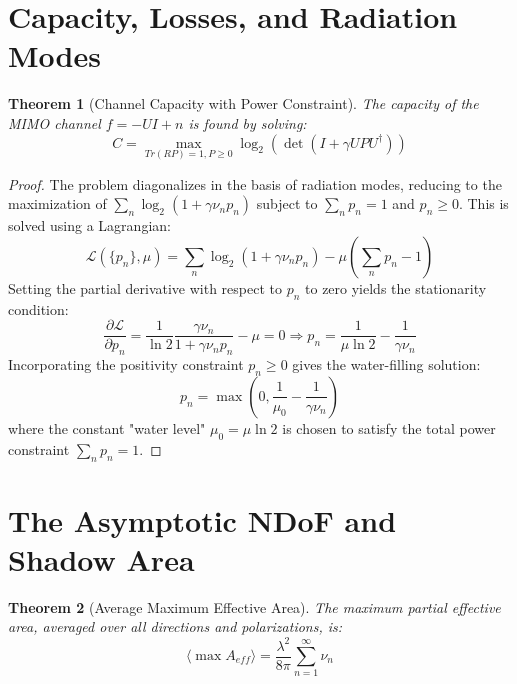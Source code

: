 \documentclass[11pt,a4paper]{article}
\newcommand{\herm}{\dagger}
\newtheorem{theorem}{Theorem}[section]
\begin{document}
\section{Capacity, Losses, and Radiation Modes}

\begin{theorem}[Channel Capacity with Power Constraint]
The capacity of the MIMO channel \(f=-UI+n\) is found by solving:
\begin{equation}
    C=\max_{Tr(RP)=1,P\ge0}\log_{2}(\det(I+\gamma UPU^{\herm}))
\end{equation}
\end{theorem}

\begin{proof}
The problem diagonalizes in the basis of radiation modes, reducing to the maximization of \(\sum_{n}\log_{2}(1+\gamma\nu_{n}p_{n})\) subject to \(\sum_{n}p_{n}=1\) and \(p_{n}\ge0\). This is solved using a Lagrangian:
\begin{equation}
    \mathcal{L}(\{p_{n}\},\mu)=\sum_{n}\log_{2}(1+\gamma\nu_{n}p_{n})-\mu\left(\sum_{n}p_{n}-1\right)
\end{equation}
Setting the partial derivative with respect to \(p_{n}\) to zero yields the stationarity condition:
\begin{equation}
    \frac{\partial\mathcal{L}}{\partial p_{n}}=\frac{1}{\ln 2}\frac{\gamma\nu_{n}}{1+\gamma\nu_{n}p_{n}}-\mu=0 \Rightarrow p_{n}=\frac{1}{\mu \ln 2}-\frac{1}{\gamma\nu_{n}}
\end{equation}
Incorporating the positivity constraint \(p_{n}\ge0\) gives the water-filling solution:
\begin{equation}
    p_{n}=\max\left(0,\frac{1}{\mu_{0}}-\frac{1}{\gamma\nu_{n}}\right)
\end{equation}
where the constant "water level" \(\mu_{0}=\mu \ln 2\) is chosen to satisfy the total power constraint \(\sum_{n}p_{n}=1\).
\end{proof}

\section{The Asymptotic NDoF and Shadow Area}

\begin{theorem}[Average Maximum Effective Area]
The maximum partial effective area, averaged over all directions and polarizations, is:
\begin{equation}
    \langle \max A_{eff}\rangle=\frac{\lambda^{2}}{8\pi}\sum_{n=1}^{\infty}\nu_{n}
\end{equation}
\end{theorem}
\end{document}
